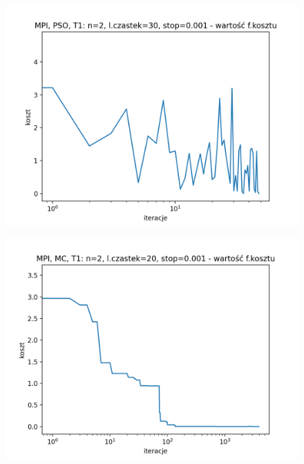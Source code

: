 \documentclass[11pt, a4paper, oneside]{article}
\begin{document}
\begin{figure}[H]
\centering
\begin{minipage}[b]{\dimexpr.5\textwidth-1em}
  \centering
  \includegraphics[width=1\linewidth]{grafiki2/MPI_PSO_T1/MPI_PSO_T1_koszt.png}
  \label{fig:pozycjeStartowe:PSO1}
\end{minipage} \hfill
\begin{minipage}[b]{\dimexpr.5\textwidth-1em}
  \centering
  \includegraphics[width=1\linewidth]{grafiki2/MPI_MC_T1/MPI_MC_T1_koszt.png}
  \label{fig:pozycjeStartowe:MC1}
\end{minipage}
\end{figure}
\end{document}
